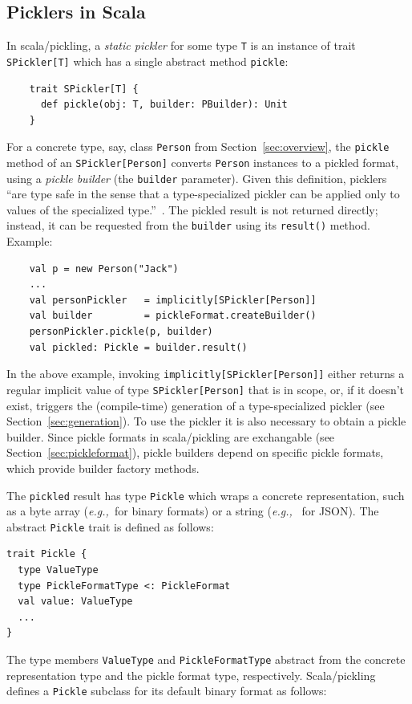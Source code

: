 \documentclass[preprint,10pt]{sigplanconf}
\theoremstyle{definition}
\theoremstyle{definition}
\newcommand{\eg}{{\em e.g.,~}}
\begin{document}
\subsection{Picklers in Scala}\label{sub:picklers-scala}

In scala/pickling, a {\em static pickler} for some type \verb|T| is an
instance of trait \verb|SPickler[T]| which has a single abstract method
\verb|pickle|:

\begin{lstlisting}
    trait SPickler[T] {
      def pickle(obj: T, builder: PBuilder): Unit
    }
\end{lstlisting}
\noindent
For a concrete type, say, class \verb|Person| from Section~\ref{sec:overview},
the \verb|pickle| method of an \verb|SPickler[Person]| converts
\verb|Person| instances to a pickled format, using a {\em pickle builder} (the
\verb|builder| parameter). Given this definition, picklers ``are type safe in
the sense that a type-specialized pickler can be applied only to values of the
specialized type.''~\cite{Elsman2005}. The pickled result is not returned
directly; instead, it can be requested from the \verb|builder| using its
\verb|result()| method. Example:

\begin{lstlisting}
    val p = new Person("Jack")
    ...
    val personPickler   = implicitly[SPickler[Person]]
    val builder         = pickleFormat.createBuilder()
    personPickler.pickle(p, builder)
    val pickled: Pickle = builder.result()
\end{lstlisting}
\noindent
In the above example, invoking \verb|implicitly[SPickler[Person]]| either
returns a regular implicit value of type \verb|SPickler[Person]| that is in
scope, or, if it doesn't exist, triggers the (compile-time) generation of a
type-specialized pickler (see Section~\ref{sec:generation}). To use the
pickler it is also necessary to obtain a pickle builder. Since pickle formats
in scala/pickling are exchangable (see Section~\ref{sec:pickleformat}), pickle
builders depend on specific pickle formats, which provide builder factory
methods.

The \verb|pickled| result has type \verb|Pickle| which wraps a concrete
representation, such as a byte array (\eg for binary formats) or a string (\eg
for JSON). The abstract \verb|Pickle| trait is defined as follows:

\begin{lstlisting}
trait Pickle {
  type ValueType
  type PickleFormatType <: PickleFormat
  val value: ValueType
  ...
}
\end{lstlisting}
\noindent
The type members \verb|ValueType| and \verb|PickleFormatType| abstract from
the concrete representation type and the pickle format type, respectively.
Scala/pickling defines a \verb|Pickle| subclass for its default binary format
as follows:
\end{document}
